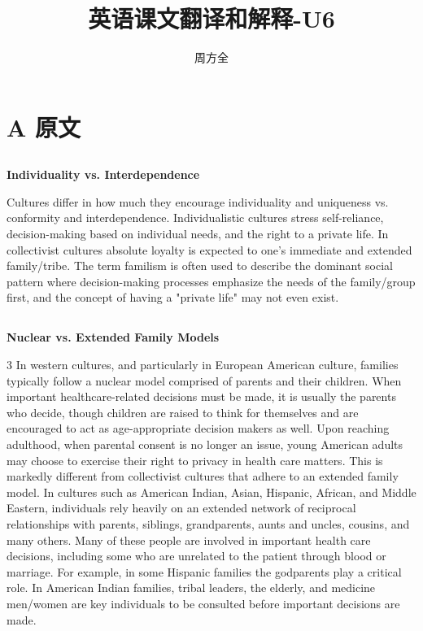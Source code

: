 \documentclass[12pt]{article}
\title{英语课文翻译和解释-U6}
\author{周方全}
\begin{document}
	
	\maketitle
	
	\section{A 原文}
	\begin{spacing}{1.5}
		{\large
			\subsection{}
			
			
			\subsection{}
			\textbf{Individuality vs. Interdependence}
			
			Cultures differ in how much they encourage individuality and uniqueness vs. conformity and interdependence. Individualistic cultures stress self-reliance, decision-making based on individual needs, and the right to a private life. In collectivist cultures absolute loyalty is expected to one's immediate and extended family/tribe. The term familism is often used to describe the dominant social pattern where decision-making processes emphasize the needs of the family/group first, and the concept of having a "private life" may not even exist.
						
			\subsection{}
			\textbf{Nuclear vs. Extended Family Models}
			
			3 In western cultures, and particularly in European American culture, families typically follow a nuclear model comprised of parents and their children. When important healthcare-related decisions must be made, it is usually the parents who decide, though children are raised to think for themselves and are encouraged to act as age-appropriate decision makers as well. Upon reaching adulthood, when parental consent is no longer an issue, young American adults may choose to exercise their right to privacy in health care matters. This is markedly different from collectivist cultures that adhere to an extended family model. In cultures such as American Indian, Asian, Hispanic, African, and Middle Eastern, individuals rely heavily on an extended network of reciprocal relationships with parents, siblings, grandparents, aunts and uncles, cousins, and many others. Many of these people are involved in important health care decisions, including some who are unrelated to the patient through blood or marriage. For example, in some Hispanic families the godparents play a critical role. In American Indian families, tribal leaders, the elderly, and medicine men/women are key individuals to be consulted before important decisions are made.
			
}
\end{spacing}
\end{document}
